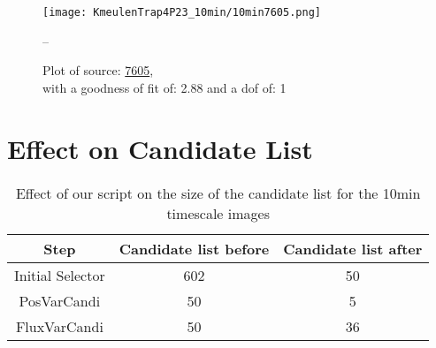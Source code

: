 \documentclass{article}
\begin{document}
\begin{figure}[H]
    \centering
    \begin{minipage}{.5\textwidth}
        \centering
        \texttt{[image: KmeulenTrap4P23\_10min/10min7605.png]}
        \captionsetup{labelformat=empty}
        \caption{Plot of source: \href{http://banana.transientskp.org/r4/vlo_KmeulenTrap4P23/runningcatalog/7605}{7605},\\with a goodness of fit of: 2.88 and a dof of: 1}
        \addtocounter{figure}{-1}
        \label{KmeulenTrap4P23:10min:7605:plot}
    \end{minipage}%
    \begin{minipage}{0.5\textwidth}
        \centering

--
        \end{minipage}
\end{figure}
\section{Effect on Candidate List}
\begin{table}[H]
    \centering
    \begin{tabular}{|c| c | c|}
    \toprule
     Step & Candidate list before & Candidate list after\\
    \midrule
        Initial Selector & 602 & 50 \\
        PosVarCandi & 50 & 5 \\
        FluxVarCandi & 50 & 36  \\
        \midrule
    \end{tabular}
    \caption{Effect of our script on the size of the candidate list for the 10min timescale images}
    \label{KmeulenTrap4P23:10min:overviewcandidates}
\end{table}
\end{document}
